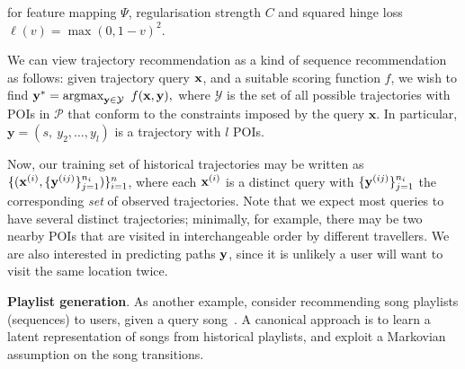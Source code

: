 for
feature mapping $\Psi$,
regularisation strength $C$ %
and squared hinge loss $\ell( v ) = \max( 0, 1 - v )^2$.

We can view trajectory recommendation as a kind of sequence recommendation as follows:
given trajectory query $\mathbf{x}$, and a suitable scoring function $f$, we wish to find
$\mathbf{y}^* = \operatorname*{argmax}_{\mathbf{y} \in \mathcal{Y}}~f(\mathbf{x}, \mathbf{y}),$ 
where $\mathcal{Y}$ is the set of all possible trajectories with POIs in $\mathcal{P}$ that conform to the constraints imposed by the query $\mathbf{x}$.
In particular,
$\mathbf{y} = (s,~ y_2, \dots, y_l)$ is a trajectory with $l$ POIs. %

Now, our training set of historical trajectories may be written as
$\{ ( \mathbf{x}^{({i})}, \{ \mathbf{y}^{({ij})} \}_{j=1}^{n_i} ) \}_{i=1}^{n}$,
where each $\mathbf{x}^{({i})}$ is a distinct query
with $\{ \mathbf{y}^{({ij})} \}_{j=1}^{n_i}$ the corresponding \emph{set} of observed trajectories.
Note that we expect most queries to have several distinct trajectories;
minimally,
for example,
there may be two nearby POIs that are visited in interchangeable order by different travellers.
We are also interested in predicting paths $\mathbf{y}$, since it is unlikely a user will want to visit the same location twice.


%
\textbf{Playlist generation}.
As another example, consider recommending song playlists (\ie sequences) to users, given a query song~\citep{McFee:2011,chen2012playlist,hidasi2015session,choi2016towards}.
A canonical approach is to
learn a latent representation of songs from historical playlists,
and exploit a Markovian assumption on the song transitions.


